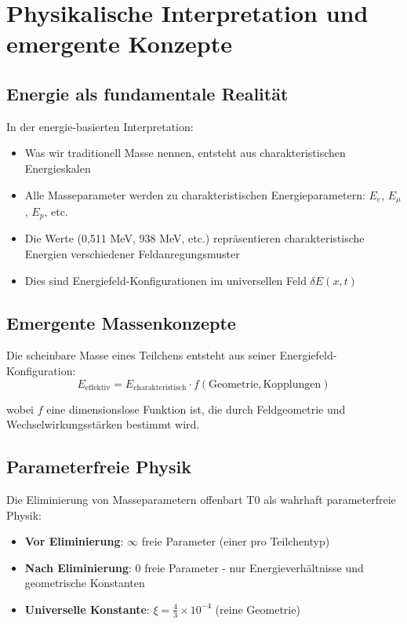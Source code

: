 \documentclass[12pt,a4paper]{report}
\begin{document}
	\section{Physikalische Interpretation und emergente Konzepte}
	\label{sec:physical_interpretation}
	
	\subsection{Energie als fundamentale Realität}
	\label{subsec:energy_fundamental}
	
	In der energie-basierten Interpretation:
	\begin{itemize}
		\item Was wir traditionell Masse nennen, entsteht aus charakteristischen Energieskalen
		\item Alle Masseparameter werden zu charakteristischen Energieparametern: $E_e$, $E_\mu$, $E_p$, etc.
		\item Die Werte (0,511 MeV, 938 MeV, etc.) repräsentieren charakteristische Energien verschiedener Feldanregungsmuster
		\item Dies sind Energiefeld-Konfigurationen im universellen Feld $\delta E(x,t)$
	\end{itemize}
	
	\subsection{Emergente Massenkonzepte}
	\label{subsec:emergent_mass}
	
	Die scheinbare Masse eines Teilchens entsteht aus seiner Energiefeld-Konfiguration:
	\begin{equation}
		E_{\text{effektiv}} = E_{\text{charakteristisch}} \cdot f(\text{Geometrie}, \text{Kopplungen})
	\end{equation}
	
	wobei $f$ eine dimensionslose Funktion ist, die durch Feldgeometrie und Wechselwirkungsstärken bestimmt wird.
	
	\subsection{Parameterfreie Physik}
	\label{subsec:parameter_free}
	
	Die Eliminierung von Masseparametern offenbart T0 als wahrhaft parameterfreie Physik:
	\begin{itemize}
		\item \textbf{Vor Eliminierung}: $\infty$ freie Parameter (einer pro Teilchentyp)
		\item \textbf{Nach Eliminierung}: 0 freie Parameter - nur Energieverhältnisse und geometrische Konstanten
		\item \textbf{Universelle Konstante}: $\xi = \frac{4}{3} \times 10^{-4}$ (reine Geometrie)
	\end{itemize}
	
\end{document}
